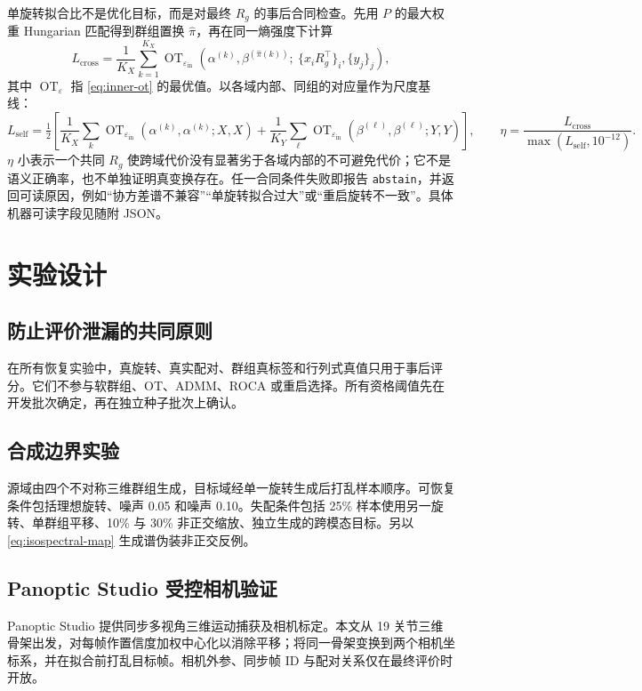 \documentclass[10pt,a4paper,fontset=windows]{ctexart}
\theoremstyle{definition}
\theoremstyle{remark}
\begin{document}
单旋转拟合比不是优化目标，而是对最终 $R_g$ 的事后合同检查。先用 $P$ 的最大权重 Hungarian 匹配得到群组置换 $\widehat\pi$，再在同一熵强度下计算
\begin{equation}
L_{\mathrm{cross}}=\frac1{K_X}\sum_{k=1}^{K_X}
\operatorname{OT}_{\varepsilon_{\mathrm{in}}}
\left(\alpha^{(k)},\beta^{(\widehat\pi(k))};\
\{x_iR_g^\top\}_i,\{y_j\}_j\right),
\label{eq:cross-fit}
\end{equation}
其中 $\operatorname{OT}_{\varepsilon}$ 指 \cref{eq:inner-ot} 的最优值。以各域内部、同组的对应量作为尺度基线：
\begin{equation}
L_{\mathrm{self}}=\tfrac12\left[
\frac1{K_X}\sum_k\operatorname{OT}_{\varepsilon_{\mathrm{in}}}
(\alpha^{(k)},\alpha^{(k)};X,X)+
\frac1{K_Y}\sum_\ell\operatorname{OT}_{\varepsilon_{\mathrm{in}}
}(\beta^{(\ell)},\beta^{(\ell)};Y,Y)\right],\qquad
\eta=\frac{L_{\mathrm{cross}}}{\max(L_{\mathrm{self}},10^{-12})}.
\label{eq:eta}
\end{equation}
$\eta$ 小表示一个共同 $R_g$ 使跨域代价没有显著劣于各域内部的不可避免代价；它不是语义正确率，也不单独证明真变换存在。任一合同条件失败即报告 \texttt{abstain}，并返回可读原因，例如“协方差谱不兼容”“单旋转拟合过大”或“重启旋转不一致”。具体机器可读字段见随附 JSON。

\section{实验设计}
\label{sec:experiments}

\subsection{防止评价泄漏的共同原则}
在所有恢复实验中，真旋转、真实配对、群组真标签和行列式真值只用于事后评分。它们不参与软群组、OT、ADMM、ROCA 或重启选择。所有资格阈值先在开发批次确定，再在独立种子批次上确认。

\subsection{合成边界实验}
源域由四个不对称三维群组生成，目标域经单一旋转生成后打乱样本顺序。可恢复条件包括理想旋转、噪声 0.05 和噪声 0.10。失配条件包括 25\% 样本使用另一旋转、单群组平移、10\% 与 30\% 非正交缩放、独立生成的跨模态目标。另以 \cref{eq:isospectral-map} 生成谱伪装非正交反例。

\subsection{Panoptic Studio 受控相机验证}
Panoptic Studio 提供同步多视角三维运动捕获及相机标定\cite{joo2015panoptic}。本文从 19 关节三维骨架出发，对每帧作置信度加权中心化以消除平移；将同一骨架变换到两个相机坐标系，并在拟合前打乱目标帧。相机外参、同步帧 ID 与配对关系仅在最终评价时开放。
\end{document}
